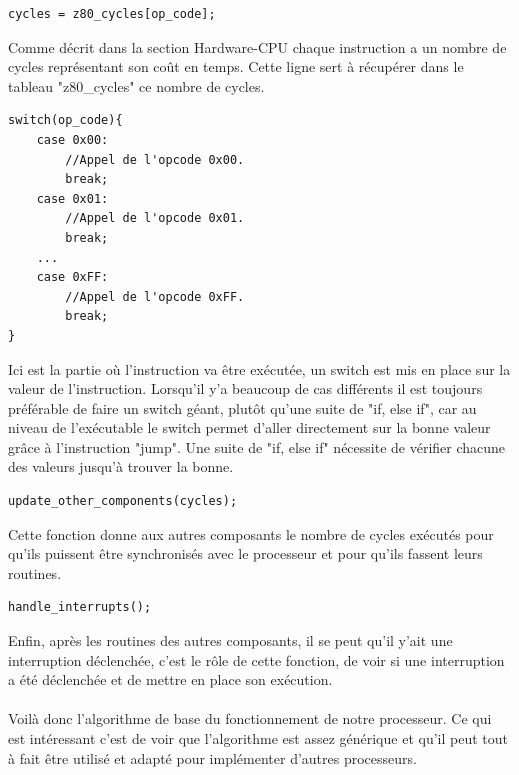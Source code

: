 \documentclass[french]{report}
\begin{document}
\begin{lstlisting}
cycles = z80_cycles[op_code];
\end{lstlisting}
Comme décrit dans la section Hardware-CPU chaque instruction a un nombre de cycles représentant son coût en temps. Cette ligne sert à récupérer dans le tableau "z80\_cycles" ce nombre de cycles.
\begin{lstlisting}
switch(op_code){	
	case 0x00:
		//Appel de l'opcode 0x00.
		break;
	case 0x01:
		//Appel de l'opcode 0x01.
		break;
	...
	case 0xFF:
		//Appel de l'opcode 0xFF.
		break;
}
\end{lstlisting}
Ici est la partie où l'instruction va être exécutée, un switch est mis en place sur la valeur de l'instruction. Lorsqu'il y'a beaucoup de cas différents il est toujours préférable de faire un switch géant, plutôt qu'une suite de "if, else if", car au niveau de l'exécutable le switch permet d'aller directement sur la bonne valeur grâce à l'instruction "jump". Une suite de "if, else if" nécessite de vérifier chacune des valeurs jusqu'à trouver la bonne. 
\begin{lstlisting}
update_other_components(cycles);
\end{lstlisting}
Cette fonction donne aux autres composants le nombre de cycles exécutés pour qu'ils puissent être synchronisés avec le processeur et pour qu'ils fassent leurs routines.
\begin{lstlisting}
handle_interrupts();
\end{lstlisting}
Enfin, après les routines des autres composants, il se peut qu'il y'ait une interruption déclenchée, c'est le rôle de cette fonction, de voir si une interruption a été déclenchée et de mettre en place son exécution.\\\\
Voilà donc l'algorithme de base du fonctionnement de notre processeur. Ce qui est intéressant c'est de voir que l'algorithme est assez générique et qu'il peut tout à fait être utilisé et adapté pour implémenter d'autres processeurs.
\end{document}
